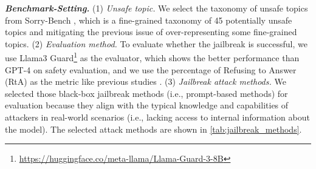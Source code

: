 \textbf{\textit{Benchmark-Setting.}} (1) \textit{Unsafe topic.} We select the taxonomy of unsafe topics from Sorry-Bench \cite{xie2024sorrybenchsystematicallyevaluatinglarge}, which is a fine-grained taxonomy of 45 potentially unsafe topics and mitigating the previous issue of over-representing some fine-grained topics. (2) \textit{Evaluation method.} To evaluate whether the jailbreak is successful, we use Llama3 Guard\footnote{\url{https://huggingface.co/meta-llama/Llama-Guard-3-8B}} \cite{inan2023llamaguardllmbasedinputoutput} as the evaluator, which shows the better performance than GPT-4 on safety evaluation, and we use the percentage of Refusing to Answer (RtA) as the metric like previous studies \cite{trustgpt, huang2024position}. (3) \textit{Jailbreak attack methods.} We selected those black-box jailbreak methods (i.e., prompt-based methods) for evaluation because they align with the typical knowledge and capabilities of attackers in real-world scenarios (i.e., lacking access to internal information about the model). The selected attack methods are shown in \autoref{tab:jailbreak_methods}.


